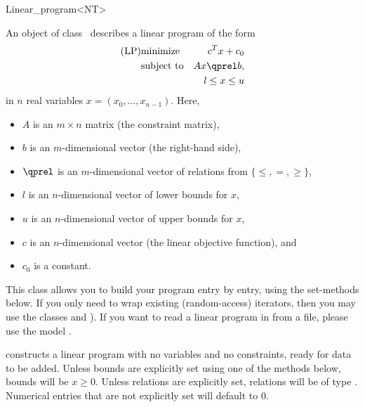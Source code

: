 \begin{ccRefClass}{Linear_program<NT>}


\ccDefinition
An object of class \ccRefName\ describes a linear program of the form
\begin{eqnarray*}
\mbox{(LP)}& \mbox{minimize} & c^{T}x+c_0 \\
&\mbox{subject to}   & Ax\qprel b, \\
&                    & l \leq x \leq u
\end{eqnarray*}
in $n$ real variables $x=(x_0,\ldots,x_{n-1})$.
Here, 
\begin{itemize}
\item $A$ is an $m\times n$ matrix (the constraint matrix), 
\item $b$ is an $m$-dimensional vector (the right-hand side),
\item $\qprel$ is an $m$-dimensional vector of relations 
from $\{\leq, =, \geq\}$, 
\item $l$ is an $n$-dimensional vector of lower
bounds for $x$,
\item $u$ is an $n$-dimensional vector of upper bounds for
$x$, 
\item $c$ is an $n$-dimensional vector (the linear objective
  function), and 
\item $c_0$ is a constant.
\end{itemize}

This class allows you to build your program entry by entry, using
the set-methods below. If you only need to wrap existing (random-access)
iterators, then you may use the classes 
 and ). If you want
to read a linear program in  from a file, please use
the model .

\ccIsModel
{}

\ccTypes


\ccCreation
\ccIndexClassCreation
{}

{constructs a linear program with no variables and no constraints, ready
for data to be added. Unless
bounds are explicitly set using one of the methods below, bounds will be
$x\geq 0$. Unless relations are explicitly set, relations will be of type
. Numerical entries that are not explicitly set will
default to $0$.}


\end{ccRefClass}
